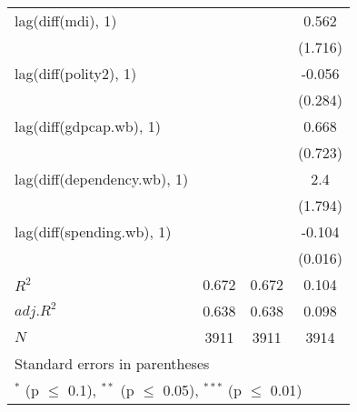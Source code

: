 \begin{table}[htbp]
\begin{tabular}{l*{3}{c}}
lag(diff(mdi), 1) 		& 		& 		&0.562 \\
  		& 		& 		&(1.716) \\
lag(diff(polity2), 1) 		& 		& 		&-0.056 \\
  		& 		& 		&(0.284) \\
lag(diff(gdpcap.wb), 1) 		& 		& 		&0.668 \\
  		& 		& 		&(0.723) \\
lag(diff(dependency.wb), 1) 		& 		& 		&2.4 \\
  		& 		& 		&(1.794) \\
lag(diff(spending.wb), 1) 		& 		& 		&-0.104\sym{***} \\
  		& 		& 		&(0.016) \\
\hline
$R^2$ 		&0.672 		&0.672 		&0.104 \\
$adj.R^2$ 		&0.638 		&0.638 		&0.098 \\
$N$ 		&\multicolumn{1}{c}{3911} 		&\multicolumn{1}{c}{3911} 		&\multicolumn{1}{c}{3914} \\
\hline\hline
\multicolumn{4}{l}{\footnotesize Standard errors in parentheses}\\
\multicolumn{4}{l}{\footnotesize $^{*}$ (p $\le$ 0.1), $^{**}$ (p $\le$ 0.05), $^{***}$ (p $\le$ 0.01)}\\
\end{tabular}
\end{table}
